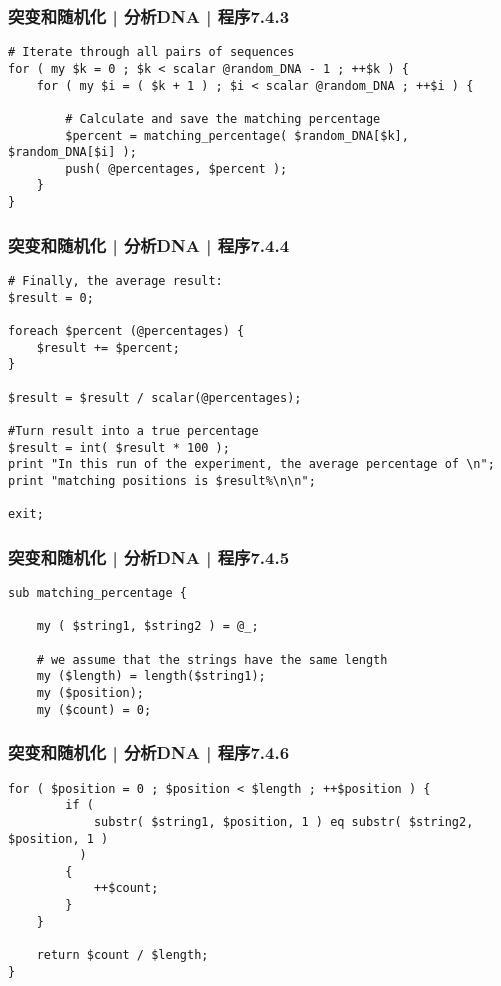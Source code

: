 \begin{frame}[fragile]
  \frametitle{突变和随机化 | 分析DNA | 程序7.4.3}
\begin{lstlisting}[firstnumber=23]
# Iterate through all pairs of sequences
for ( my $k = 0 ; $k < scalar @random_DNA - 1 ; ++$k ) {
    for ( my $i = ( $k + 1 ) ; $i < scalar @random_DNA ; ++$i ) {

        # Calculate and save the matching percentage
        $percent = matching_percentage( $random_DNA[$k], $random_DNA[$i] );
        push( @percentages, $percent );
    }
}
\end{lstlisting}
\end{frame}

\begin{frame}[fragile]
  \frametitle{突变和随机化 | 分析DNA | 程序7.4.4}
\begin{lstlisting}[firstnumber=33]
# Finally, the average result:
$result = 0;

foreach $percent (@percentages) {
    $result += $percent;
}

$result = $result / scalar(@percentages);

#Turn result into a true percentage
$result = int( $result * 100 );
print "In this run of the experiment, the average percentage of \n";
print "matching positions is $result%\n\n";

exit;
\end{lstlisting}
\end{frame}

\begin{frame}[fragile]
  \frametitle{突变和随机化 | 分析DNA | 程序7.4.5}
\begin{lstlisting}[firstnumber=58]
sub matching_percentage {

    my ( $string1, $string2 ) = @_;

    # we assume that the strings have the same length
    my ($length) = length($string1);
    my ($position);
    my ($count) = 0;
\end{lstlisting}
\end{frame}

\begin{frame}[fragile]
  \frametitle{突变和随机化 | 分析DNA | 程序7.4.6}
\begin{lstlisting}[firstnumber=67]
    for ( $position = 0 ; $position < $length ; ++$position ) {
        if (
            substr( $string1, $position, 1 ) eq substr( $string2, $position, 1 )
          )
        {
            ++$count;
        }
    }

    return $count / $length;
}
\end{lstlisting}
\end{frame}

